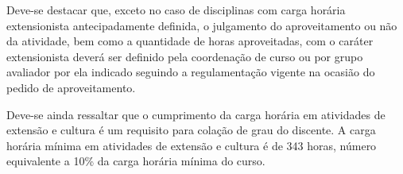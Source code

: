 Deve-se destacar que, exceto no caso de disciplinas com carga horária extensionista antecipadamente definida, o julgamento do aproveitamento ou não da atividade, bem como a quantidade de horas aproveitadas, com o caráter extensionista deverá ser definido pela coordenação de curso ou por grupo avaliador por ela indicado seguindo a regulamentação vigente na ocasião do pedido de aproveitamento.

Deve-se ainda ressaltar que o cumprimento da carga horária em atividades de extensão e cultura é um requisito para colação de grau do discente. A carga horária mínima em atividades de extensão e cultura é de 343 horas, número equivalente a 10\% da carga horária mínima do curso.